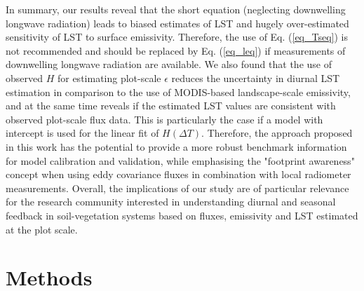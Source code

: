 \documentclass[fleqn,10pt]{wlscirep}
\begin{document}
{{In summary, our results reveal that the short equation (neglecting downwelling longwave radiation) leads to biased estimates of LST and hugely over-estimated sensitivity of LST to surface emissivity. Therefore, the use of Eq. (\ref{eq_Tseq}) is not recommended and should be replaced by Eq. (\ref{eq_leq}) if measurements of downwelling longwave radiation are available. 
We also found that the use of observed $H$ for estimating plot-scale $\epsilon$ reduces the uncertainty in diurnal LST estimation in comparison to the use of MODIS-based landscape-scale emissivity, and at the same time reveals if the estimated LST values are consistent with observed plot-scale flux data. This is particularly the case if a model with intercept is used for the linear fit of $H (\Delta T)$. Therefore, the approach proposed in this work has the potential to provide a more robust benchmark information for model calibration and validation, while emphasising the "footprint awareness" concept when using eddy covariance fluxes in combination with local radiometer measurements. Overall, the implications of our study are of particular relevance for the research community interested in understanding diurnal and seasonal feedback in soil-vegetation systems based on fluxes, emissivity and LST estimated at the plot scale. %


\section{Methods}  \label{sec:Methods}
}}
\end{document}

